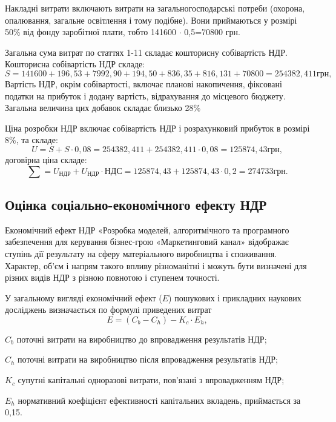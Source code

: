 Накладні витрати включають витрати на загальногосподарські потреби (охорона, опалювання, загальне освітлення і тому подібне). Вони приймаються у розмірі 50\% від фонду заробітної плати, тобто 141600 $\cdot$  0,5=70800 грн. 

Загальна сума витрат по статтях 1-11 складає кошторисну собівартість НДР. Кошторисна собівартість НДР складе:
\begin{equation}
S = 141600+196,53+7992,90+194,50+836,35+816,131 + 70800 = 254382,411 грн	, \nonumber
\end{equation}
Вартість НДР, окрім собівартості, включає планові накопичення, фіксовані податки на прибуток і додану вартість, відрахування до місцевого бюджету. Загальна величина цих добавок складає близько 28\%

Ціна розробки НДР включає собівартість НДР і розрахунковий прибуток в розмірі 8\%, та складе:
\begin{equation}
U=S+S  \cdot  0,08 = 254382,411+254382,411  \cdot  0,08=125874,43 грн, \nonumber
\end{equation}
договірна ціна складе: 
\begin{equation}
\sum = U_{\text{НДР}} + U_{\text{НДР}} \cdot {\text{НДС}} = 125874,43+125874,43  \cdot  0,2=274733 грн. \nonumber
\end{equation}

\subsection{Оцінка соціально-економічного ефекту НДР}
Економічний ефект НДР «Розробка моделей, алгоритмічного та програмного забезпечення для керування бізнес-грою «Маркетинговий канал» відображає ступінь дії результату на сферу матеріального виробництва і споживання. Характер, об'єм і напрям такого впливу різноманітні і можуть бути визначені для різних видів НДР з різною повнотою і ступенем точності.

У загальному вигляді економічний ефект ($E$) пошукових і прикладних наукових досліджень визначається по формулі приведених витрат
\begin{equation}
E = (C_b - C_h) - K_c   \cdot   E_h, \nonumber
\end{equation}
\begin{formulaDescription}
\item [$C_b$] поточні витрати на виробництво до впровадження результатів НДР;
\item [$C_h$] поточні витрати на виробництво після впровадження результатів НДР;
\item [$K_c$] супутні капітальні одноразові витрати, пов'язані з впровадженням НДР;
\item [$E_h$] нормативний коефіцієнт ефективності капітальних вкладень, приймається за 0,15.
\end{formulaDescription}

